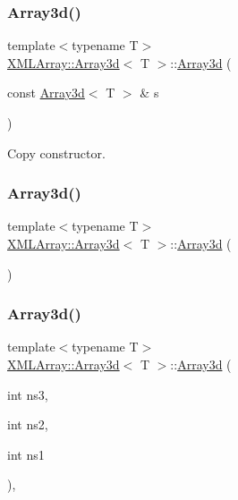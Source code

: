\subsubsection{\texorpdfstring{Array3d()}{Array3d()}\hspace{0.1cm}{\footnotesize\ttfamily [3/9]}}
{\footnotesize\ttfamily template$<$typename T$>$ \\
\mbox{\hyperlink{classXMLArray_1_1Array3d}{X\+M\+L\+Array\+::\+Array3d}}$<$ T $>$\+::\mbox{\hyperlink{classXMLArray_1_1Array3d}{Array3d}} (\begin{DoxyParamCaption}\item[{const \mbox{\hyperlink{classXMLArray_1_1Array3d}{Array3d}}$<$ T $>$ \&}]{s }\end{DoxyParamCaption})\hspace{0.3cm}{\ttfamily [inline]}}



Copy constructor. 

\mbox{\label{classXMLArray_1_1Array3d_a05f33dbf6ca20ca7a16ec3e6d74f272b}} 
\subsubsection{\texorpdfstring{Array3d()}{Array3d()}\hspace{0.1cm}{\footnotesize\ttfamily [4/9]}}
{\footnotesize\ttfamily template$<$typename T$>$ \\
\mbox{\hyperlink{classXMLArray_1_1Array3d}{X\+M\+L\+Array\+::\+Array3d}}$<$ T $>$\+::\mbox{\hyperlink{classXMLArray_1_1Array3d}{Array3d}} (\begin{DoxyParamCaption}{ }\end{DoxyParamCaption})\hspace{0.3cm}{\ttfamily [inline]}}

\mbox{\label{classXMLArray_1_1Array3d_ae97f5fabfb023196e45ab6fd53d533d9}} 
\subsubsection{\texorpdfstring{Array3d()}{Array3d()}\hspace{0.1cm}{\footnotesize\ttfamily [5/9]}}
{\footnotesize\ttfamily template$<$typename T$>$ \\
\mbox{\hyperlink{classXMLArray_1_1Array3d}{X\+M\+L\+Array\+::\+Array3d}}$<$ T $>$\+::\mbox{\hyperlink{classXMLArray_1_1Array3d}{Array3d}} (\begin{DoxyParamCaption}\item[{int}]{ns3,  }\item[{int}]{ns2,  }\item[{int}]{ns1 }\end{DoxyParamCaption})\hspace{0.3cm}{\ttfamily [inline]}, {\ttfamily [explicit]}}

